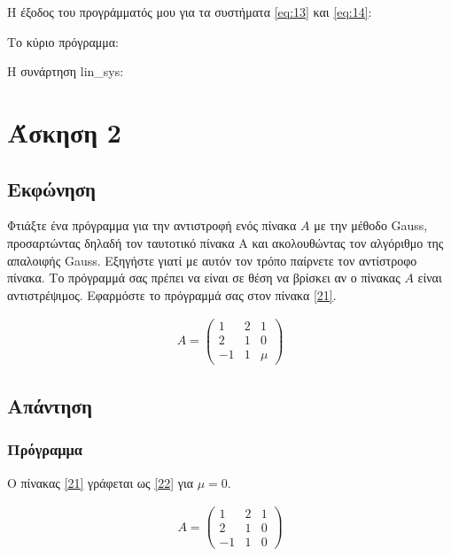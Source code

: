 \documentclass[12pt, fleqn, leqno]{extreport}
\begin{document}
Η έξοδος του προγράμματός μου για τα συστήματα \eqref{eq:13} και \eqref{eq:14}:


\newpage
Το κύριο πρόγραμμα:


\newpage
Η συνάρτηση lin\_sys:\label{lin_sys}


\chapter{Άσκηση 2}
\section{Εκφώνηση}

Φτιάξτε ένα πρόγραμμα για την αντιστροφή ενός πίνακα $A$ με την μέθοδο Gauss, προσαρτώντας δηλαδή τον ταυτοτικό πίνακα Α και ακολουθώντας τον αλγόριθμο της απαλοιφής Gauss. Εξηγήστε γιατί με αυτόν τον τρόπο παίρνετε τον αντίστροφο πίνακα. Το πρόγραμμά σας πρέπει να είναι σε θέση να βρίσκει αν ο πίνακας $A$ είναι αντιστρέψιμος. Εφαρμόστε το πρόγραμμά σας στον πίνακα \eqref{21}.

\begin{equation}
    \begin{aligned}
        A = \begin{pmatrix}
            1  & 2 & 1   \\
            2  & 1 & 0   \\
            -1 & 1 & \mu
        \end{pmatrix}\label{21}
    \end{aligned}
\end{equation}


\newpage
\section{Απάντηση}

\subsection{Πρόγραμμα}

Ο πίνακας \eqref{21} γράφεται ως \eqref{22} για $\mu = 0$.

\begin{equation}
    \begin{aligned}
        A = \begin{pmatrix}
            1  & 2 & 1 \\
            2  & 1 & 0 \\
            -1 & 1 & 0
        \end{pmatrix}\label{22}
    \end{aligned}
\end{equation}
\end{document}
